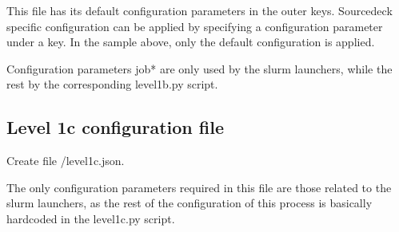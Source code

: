 \documentclass[letterpaper,10pt,english]{sphinxmanual}
\begin{document}
\begin{sphinxVerbatim}[commandchars=\\\{\}]
           
\end{sphinxVerbatim}

This file has its default configuration parameters in the outer keys.
Source\sphinxhyphen{}deck specific configuration can be applied by specifying a configuration
parameter under a  key. In the sample above, only the default
configuration is applied.

Configuration parameters job* are only used by the slurm launchers, while the
rest by the corresponding level1b.py script.


\subsection{Level 1c configuration file}
\label{\detokenize{index:level-1c-configuration-file}}\label{\detokenize{index:level1c-config-file}}
Create file /level1c.json.

The only configuration parameters
required in this file are those related to the slurm launchers, as the rest of
the configuration of this process is basically hardcoded in the level1c.py
script.
\end{document}
